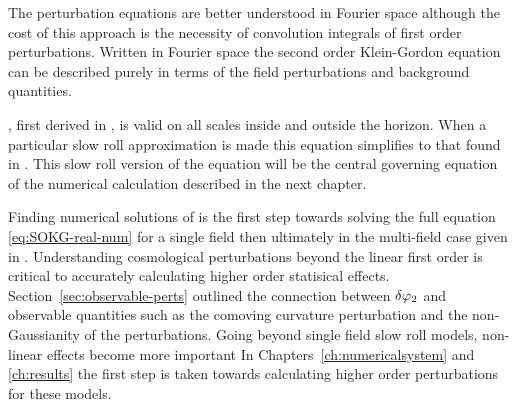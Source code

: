 The perturbation equations are better understood in Fourier space although the cost
of this approach is the necessity of convolution integrals of first order
perturbations. Written in Fourier space the second order Klein-Gordon equation can
be described purely in terms of the field perturbations and background quantities. 

, first derived in , is valid on all scales
inside and outside the horizon. When a particular slow roll approximation is made
this equation simplifies to that found in . This slow roll
version of the equation will be the central governing equation of the numerical
calculation described in the next chapter.

Finding numerical solutions of  is the first step towards
solving the full equation \eqref{eq:SOKG-real-num} for a single field then
ultimately in the multi-field case given in . Understanding
cosmological perturbations beyond the linear first order is critical to accurately
calculating higher order statisical effects. Section~\ref{sec:observable-perts}
outlined the connection between $\delta\varphi_{2}$ and observable quantities such as the
comoving curvature perturbation and the non-Gaussianity of the perturbations. Going
beyond single field slow roll models, non-linear effects become more important In
Chapters~\ref{ch:numericalsystem} and \ref{ch:results} the first step is taken
towards calculating higher order perturbations for these models.